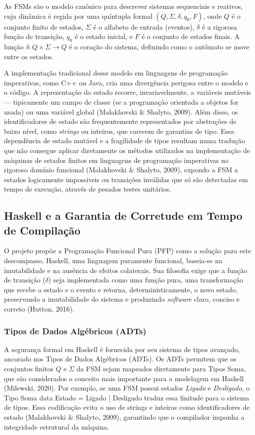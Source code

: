 \documentclass[12pt,a4paper]{article}
\begin{document}
As FSMs são o modelo canônico para descrever sistemas sequenciais e reativos, cuja dinâmica é regida por uma quíntupla formal $(Q, \Sigma, \delta, q_0, F)$, onde $Q$ é o conjunto finito de estados, $\Sigma$ é o alfabeto de entrada (eventos), $\delta$ é a rigorosa função de transição, $q_0$ é o estado inicial, e $F$ é o conjunto de estados finais. A função $\delta: Q \times \Sigma \to Q$ é o coração do sistema, definindo como o autômato se move entre os estados.

A implementação tradicional desse modelo em linguagens de programação imperativas, como C++ ou Java, cria uma divergência perigosa entre o modelo e o código. A representação do estado recorre, invariavelmente, a variáveis mutáveis --- tipicamente um campo de classe (se a programação orientada a objetos for usada) ou uma variável global (Malakhovski \& Shalyto, 2009). Além disso, os identificadores de estado são frequentemente representados por abstrações de baixo nível, como \textit{strings} ou inteiros, que carecem de garantias de tipo. Essa dependência de estado mutável e a fragilidade de tipos resultam numa tradução que não consegue aplicar diretamente os métodos utilizados na implementação de máquinas de estados finitos em linguagens de programação imperativas no rigoroso domínio funcional (Malakhovski \& Shalyto, 2009), expondo a FSM a estados logicamente impossíveis ou transições inválidas que só são detectadas em tempo de execução, através de pesados testes unitários.

\subsection{Haskell e a Garantia de Corretude em Tempo de Compilação}
O projeto propõe a Programação Funcional Pura (PFP) como a solução para este descompasso. Haskell, uma linguagem puramente funcional, baseia-se na imutabilidade e na ausência de efeitos colaterais. Sua filosofia exige que a função de transição ($\delta$) seja implementada como uma função pura, uma transformação que recebe o estado e o evento e retorna, deterministicamente, o novo estado, preservando a imutabilidade do sistema e produzindo \textit{software} claro, conciso e correto (Hutton, 2016).

\subsubsection{Tipos de Dados Algébricos (ADTs)}
A segurança formal em Haskell é fornecida por seu sistema de tipos avançado, ancorado nos Tipos de Dados Algébricos (ADTs). Os ADTs permitem que os conjuntos finitos $Q$ e $\Sigma$ da FSM sejam mapeados diretamente para Tipos Soma, que são considerados o conceito mais importante para a modelagem em Haskell (Milewski, 2020). Por exemplo, se uma FSM possui estados \textit{Ligado} e \textit{Desligado}, o Tipo Soma data Estado = Ligado | Desligado traduz essa finitude para o sistema de tipos. Essa codificação evita o uso de strings e inteiros como identificadores de estado (Malakhovski \& Shalyto, 2009), garantindo que o compilador imponha a integridade estrutural da máquina.
\end{document}
